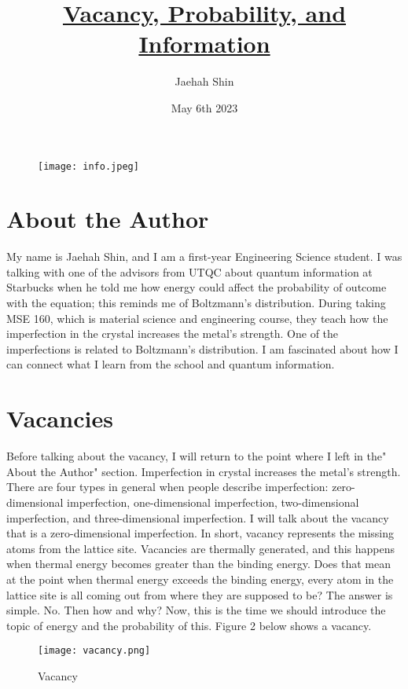 \documentclass{article}
\title{\underline {\textbf{Vacancy, Probability, and Information}}}
\author{Jaehah Shin}
\date{May 6th 2023}
\begin{document}
\maketitle
\begin{figure}[h]
    \centering
    \texttt{[image: info.jpeg]}
    \caption{}
    \label{fig1}
    
\end{figure}

\section{About the Author}
My name is Jaehah Shin, and I am a first-year Engineering Science student. 
I was talking with one of the advisors from UTQC about quantum information at Starbucks when he told me how energy could affect the probability of outcome with the equation;
this reminds me of Boltzmann's distribution. During taking MSE 160, which is material science and engineering course, they teach how the imperfection in the crystal increases the metal's strength. 
One of the imperfections is related to Boltzmann's distribution.
I am fascinated about how I can connect what I learn from the school and quantum information.

\section{Vacancies}
Before talking about the vacancy, I will return to the point where I left in the" About the Author" section. 
Imperfection in crystal increases the metal's strength. 
There are four types in general when people describe imperfection: zero-dimensional imperfection, one-dimensional imperfection, two-dimensional imperfection, and three-dimensional imperfection. 
I will talk about the vacancy that is a zero-dimensional imperfection. 
In short, vacancy represents the missing atoms from the lattice site.
Vacancies are thermally generated, and this happens when thermal energy becomes greater than the binding energy. 
Does that mean at the point when thermal energy exceeds the binding energy, every atom in the lattice site is all coming out from where they are supposed to be? 
The answer is simple. No. Then how and why? 
Now, this is the time we should introduce the topic of energy and the probability of this. 
Figure 2 below shows a vacancy.
\begin{figure}[h]
    \centering
    \texttt{[image: vacancy.png]}
    \caption{Vacancy}
    \label{fig:Vacancy}
\end{figure}
\end{document}
